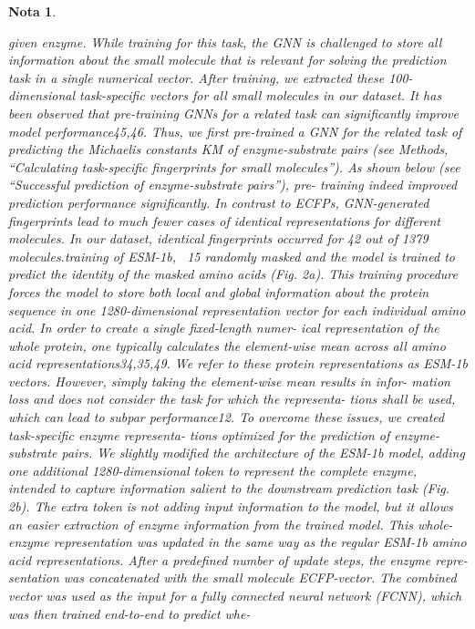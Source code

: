 \documentclass[12pt]{article}
\newtheorem{Note}{Nota}%
\begin{document}
\begin{Note}
\begin{itemize}
given enzyme. While training for this task, the GNN is challenged to
store all information about the small molecule that is relevant for
solving the prediction task in a single numerical vector. After training,
we extracted these 100-dimensional task-speciﬁc vectors for all small
molecules in our dataset. It has been observed that pre-training GNNs
for a related task can signiﬁcantly improve model performance45,46.
Thus, we ﬁrst pre-trained a GNN for the related task of predicting the
Michaelis constants KM of enzyme-substrate pairs (see Methods,
“Calculating task-speciﬁc ﬁngerprints for small molecules”). As shown
below (see “Successful prediction of enzyme-substrate pairs”), pre-
training indeed improved prediction performance signiﬁcantly. In
contrast to ECFPs, GNN-generated ﬁngerprints lead to much fewer
cases of identical representations for different molecules. In our
dataset, identical ﬁngerprints occurred for 42 out of 1379 molecules.training of ESM-1b, ~15%
randomly masked and the model is trained to predict the identity of
the masked amino acids (Fig. 2a). This training procedure forces the
model to store both local and global information about the protein
sequence in one 1280-dimensional representation vector for each
individual amino acid. In order to create a single ﬁxed-length numer-
ical representation of the whole protein, one typically calculates the
element-wise mean across all amino acid representations34,35,49. We
refer to these protein representations as ESM-1b vectors.
However, simply taking the element-wise mean results in infor-
mation loss and does not consider the task for which the representa-
tions shall be used, which can lead to subpar performance12. To
overcome these issues, we created task-speciﬁc enzyme representa-
tions optimized for the prediction of enzyme-substrate pairs. We
slightly modiﬁed the architecture of the ESM-1b model, adding one
additional 1280-dimensional token to represent the complete enzyme,
intended to capture information salient to the downstream prediction
task (Fig. 2b). The extra token is not adding input information to the
model, but it allows an easier extraction of enzyme information from
the trained model. This whole-enzyme representation was updated in
the same way as the regular ESM-1b amino acid representations.
After a predeﬁned number of update steps, the enzyme repre-
sentation was concatenated with the small molecule ECFP-vector. The
combined vector was used as the input for a fully connected neural
network (FCNN), which was then trained end-to-end to predict whe-

\end{itemize}
\end{Note}
\end{document}
